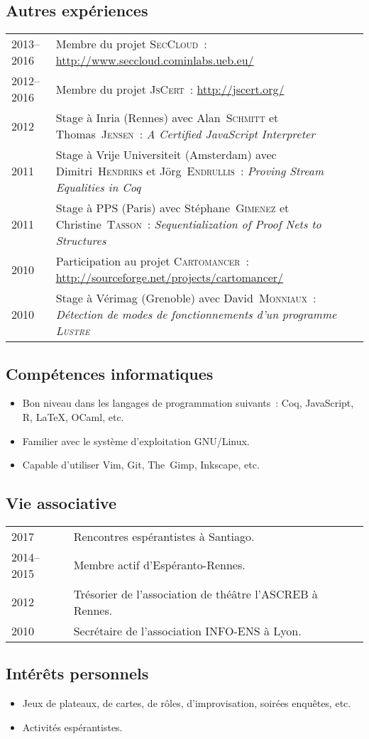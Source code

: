 \documentclass[12pt,a4paper]{article}
\makeatletter
\newcommand{\en}[1]{\foreignlanguage{english}{{#1}}}
\newcommand{\en}[1]{\foreignlanguage{english}{{#1}}}
\newenvironment{datecvsection}[1]%
               {\subsection*{#1}%
                 \noindent \begin{tabular}{@{}p{\annee}p{\texte}@{}}}
               {\end{tabular}}
\newenvironment{itemcvsection}[1]%
               {\subsection*{#1}\begin{itemize}}
               {\end{itemize}}
\newcommand\familyName{\textsc}
\newcommand\placeName{}
\makeatother
\begin{document}
\begin{datecvsection}{Autres expériences}

	2013–2016 & Membre du projet \textsc{SecCloud}~:  \url{http://www.seccloud.cominlabs.ueb.eu/} \\

	2012–2016 & Membre du projet \textsc{JsCert}~:  \url{http://jscert.org/} \\

    2012 & Stage à \placeName{Inria} (\placeName{Rennes}) avec Alan~\familyName{Schmitt} et Thomas~\familyName{Jensen}~:
	\en{\textit{A Certified JavaScript Interpreter}} \\

    2011 & Stage à \placeName{Vrĳe Universiteit} (\placeName{Amsterdam}) avec Dimitri~\familyName{Hendriks} et Jörg~\familyName{Endrullis}~:
	\en{\textit{Proving Stream Equalities in Coq}} \\

    2011 & Stage à \placeName{PPS} (\placeName{Paris}) avec Stéphane~\familyName{Gimenez} et Christine~\familyName{Tasson}~:
	\en{\textit{Sequentialization of Proof Nets to Structures}} \\

	2010 & Participation au projet \textsc{Cartomancer}~:  \url{http://sourceforge.net/projects/cartomancer/} \\

    2010 & Stage à \placeName{Vérimag} (\placeName{Grenoble}) avec David~\familyName{Monniaux}~:
	\textit{Détection de modes de fonctionnements d’un programme \textsc{Lustre}} \\

\end{datecvsection}

\begin{itemcvsection}{Compétences informatiques}

  \item Bon niveau dans les langages de programmation suivants~:  Coq, JavaScript, R, \LaTeX, OCaml, etc.
  \item Familier avec le système d’exploitation GNU/Linux.
  \item Capable d’utiliser Vim, Git, The~Gimp, Inkscape, etc.

\end{itemcvsection}

\begin{datecvsection}{Vie associative}

    2017 & Rencontres espérantistes à \placeName{Santiago}. \\
    2014–2015 & Membre actif d’{Espéranto-Rennes}. \\
	2012 & Trésorier de l’association de théâtre l’{ASCREB} à \placeName{Rennes}. \\
    2010 & Secrétaire de l’association \textsc{INFO-ENS} à \placeName{Lyon}. \\

\end{datecvsection}

\begin{itemcvsection}{Intérêts personnels}

  \item Jeux de plateaux, de cartes, de rôles, d’improvisation, soirées enquêtes, etc.
  \item Activités espérantistes.

\end{itemcvsection}
\end{document}
